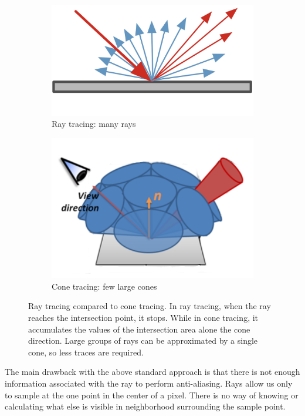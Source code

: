 \begin{figure}\label{f:ray-tracing-vs-cone-tracing}
	\begin{subfigure}[b]{0.47\textwidth}
		\includegraphics[width=1.0\textwidth]{graphics/vct/vct-1-1}
		\caption{Ray tracing: many rays}
	\end{subfigure}
	\begin{subfigure}[b]{0.53\textwidth}
		\includegraphics[width=1.0\textwidth]{graphics/vct/vct-1-2}
		\caption{Cone tracing: few large cones}
	\end{subfigure}
	\caption{Ray tracing compared to cone tracing. In ray tracing, when the ray reaches the intersection point, it stops. While in cone tracing, it accumulates the values of the intersection area alone the cone direction. Large groups of rays can be approximated by a single cone, so less traces are required.}
\end{figure}

The main drawback with the above standard approach is that there is not enough information associated with the ray to perform anti-aliasing. Rays allow us only to sample at the one point in the center of a pixel. There is no way of knowing or calculating what else is visible in neighborhood surrounding the sample point.

